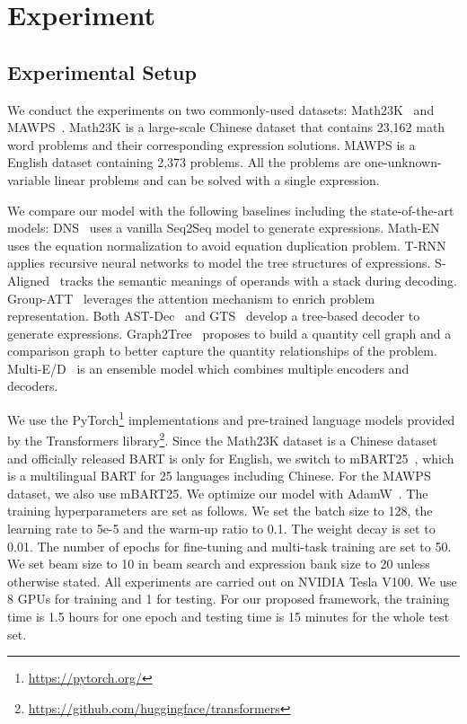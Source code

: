 \section{Experiment}
\subsection{Experimental Setup}
We conduct the experiments on two commonly-used datasets: Math23K~\cite{wang-etal-2017-deep-neural} and MAWPS~\cite{koncel-kedziorski_mawps:_2016}. Math23K is a large-scale Chinese dataset that contains 23,162 math word problems and their corresponding expression solutions. MAWPS is a English dataset containing 2,373 problems. All the problems are one-unknown-variable linear problems and can be solved with a single expression.

\vspace{2mm}
We compare our model with the following baselines including the state-of-the-art models: DNS~\cite{wang-etal-2017-deep-neural} uses a vanilla Seq2Seq model to generate expressions. Math-EN~\cite{wang_translating_2018} uses the equation normalization to avoid equation duplication problem. T-RNN~\cite{wang_template-based_2019} applies recursive neural networks to model the tree structures of expressions. S-Aligned~\cite{chiang_semantically-aligned_2019} tracks the semantic meanings of operands with a stack during decoding. Group-ATT~\cite{li_modeling_2019} leverages the attention mechanism to enrich problem representation. Both AST-Dec~\cite{liu_tree-structured_2019} and GTS~\cite{xie_goal-driven_2019} develop a tree-based decoder to generate expressions. Graph2Tree~\cite{zhang_graph--tree_2020} proposes to build a quantity cell graph and a comparison graph to better capture the quantity relationships of the problem. Multi-E/D~\cite{shen_solving_2020} is an ensemble model which combines multiple encoders and decoders. 

\vspace{2mm}
We use the PyTorch\footnote{\url{https://pytorch.org/}} implementations and pre-trained language models provided by the Transformers library\footnote{\url{https://github.com/huggingface/transformers}}. Since the Math23K dataset is a Chinese dataset and officially released BART is only for English, we switch to mBART25~\cite{liu_multilingual_2020}, which is a multilingual BART for 25 languages including Chinese. For the MAWPS dataset, we also use mBART25. We optimize our model with AdamW~\cite{DBLP:conf/iclr/LoshchilovH19}. The training hyperparameters are set as follows. We set the batch size to 128, the learning rate to 5e-5 and the warm-up ratio to 0.1. The weight decay is set to 0.01. The number of epochs  for fine-tuning and multi-task training are set to 50. We set beam size  to 10 in beam search and expression bank size to 20 unless otherwise stated. All experiments are carried out on NVIDIA Tesla V100. We use 8 GPUs for training and 1 for testing. For our proposed framework, the training time is 1.5 hours for one epoch and testing time is 15 minutes for the whole test set.

